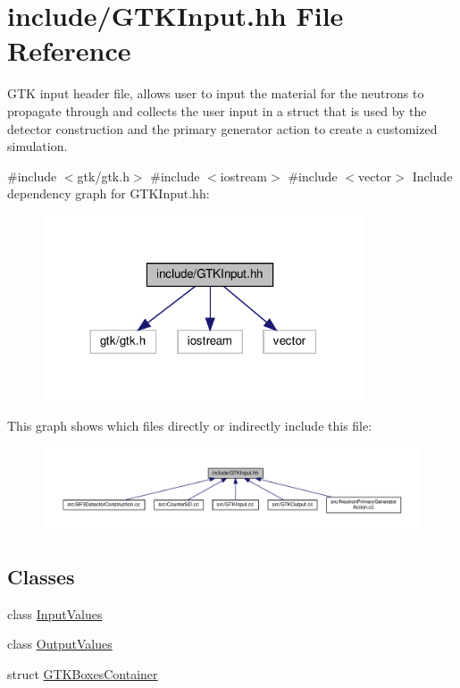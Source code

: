\hypertarget{GTKInput_8hh}{}\section{include/\+G\+T\+K\+Input.hh File Reference}
\label{GTKInput_8hh}


G\+TK input header file, allows user to input the material for the neutrons to propagate through and collects the user input in a struct that is used by the detector construction and the primary generator action to create a customized simulation.  


{\ttfamily \#include $<$gtk/gtk.\+h$>$}\newline
{\ttfamily \#include $<$iostream$>$}\newline
{\ttfamily \#include $<$vector$>$}\newline
Include dependency graph for G\+T\+K\+Input.\+hh\+:
\nopagebreak
\begin{figure}[H]
\begin{center}
\leavevmode
\includegraphics[width=270pt]{GTKInput_8hh__incl}
\end{center}
\end{figure}
This graph shows which files directly or indirectly include this file\+:
\nopagebreak
\begin{figure}[H]
\begin{center}
\leavevmode
\includegraphics[width=350pt]{GTKInput_8hh__dep__incl}
\end{center}
\end{figure}
\subsection*{Classes}
\begin{DoxyCompactItemize}
\item 
class \hyperlink{classInputValues}{Input\+Values}
\item 
class \hyperlink{classOutputValues}{Output\+Values}
\item 
struct \hyperlink{structGTKBoxesContainer}{G\+T\+K\+Boxes\+Container}
\end{DoxyCompactItemize}
